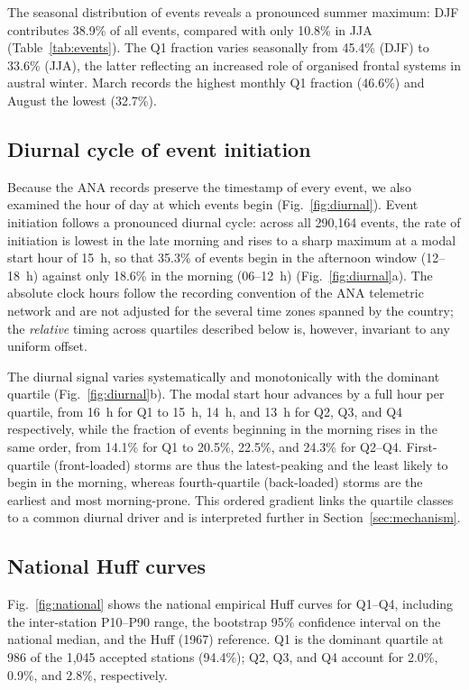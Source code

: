 \documentclass[a4paper,fleqn]{cas-sc}
\begin{document}
The seasonal distribution of events reveals a pronounced summer
maximum: DJF contributes 38.9\% of all events, compared with only
10.8\% in JJA (Table~\ref{tab:events}). The Q1 fraction varies
seasonally from 45.4\% (DJF) to 33.6\% (JJA), the latter reflecting
an increased role of organised frontal systems in austral winter.
March records the highest monthly Q1 fraction (46.6\%) and August
the lowest (32.7\%).

\subsection{Diurnal cycle of event initiation}
\label{sec:diurnal}

Because the ANA records preserve the timestamp of every event, we also
examined the hour of day at which events begin
(Fig.~\ref{fig:diurnal}). Event initiation follows a pronounced diurnal
cycle: across all 290,164 events, the rate of initiation is lowest in
the late morning and rises to a sharp maximum at a modal start hour of
15~h, so that 35.3\% of events begin in the afternoon window
(12–18~h) against only 18.6\% in the morning (06–12~h)
(Fig.~\ref{fig:diurnal}a). The absolute clock hours follow the
recording convention of the ANA telemetric network and are not
adjusted for the several time zones spanned by the country; the
\emph{relative} timing across quartiles described below is, however,
invariant to any uniform offset.

The diurnal signal varies systematically and monotonically with the
dominant quartile (Fig.~\ref{fig:diurnal}b). The modal start hour
advances by a full hour per quartile, from 16~h for Q1 to 15~h, 14~h,
and 13~h for Q2, Q3, and Q4 respectively, while the fraction of events
beginning in the morning rises in the same order, from 14.1\% for Q1 to
20.5\%, 22.5\%, and 24.3\% for Q2–Q4. First-quartile (front-loaded)
storms are thus the latest-peaking and the least likely to begin in the
morning, whereas fourth-quartile (back-loaded) storms are the earliest
and most morning-prone. This ordered gradient links the quartile
classes to a common diurnal driver and is interpreted further in
Section~\ref{sec:mechanism}.

\subsection{National Huff curves}
\label{sec:national}

Fig.~\ref{fig:national} shows the national empirical Huff curves for
Q1–Q4, including the inter-station P10–P90 range, the bootstrap 95\%
confidence interval on the national median, and the Huff (1967)
reference. Q1 is the dominant quartile at 986 of the 1,045 accepted
stations (94.4\%); Q2, Q3, and Q4 account for 2.0\%, 0.9\%, and
2.8\%, respectively.
\end{document}

